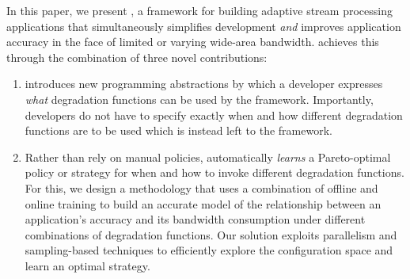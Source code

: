 In this paper, we present \sysname{}, a framework for building 
adaptive stream processing applications that simultaneously 
simplifies development \emph{and} improves application accuracy in 
the face of limited or varying wide-area bandwidth.
\sysname{} achieves this through the combination of three novel contributions: 
\begin{enumerate} 
\item \sysname{} introduces new programming abstractions by which a developer 
expresses \emph{what} degradation functions can be used by the framework. 
Importantly, developers do not have to specify exactly when and how different 
degradation functions are to be used which is instead left to the \sysname{} framework.
\item Rather than rely on manual policies, \sysname{} automatically \emph{learns} 
 a Pareto-optimal policy or strategy for when and how to invoke different degradation functions.
For this, we design a methodology that uses a combination of 
offline and online training to build an accurate model of the relationship between 
an application's accuracy and its bandwidth consumption under different combinations 
of degradation functions. Our solution exploits parallelism and sampling-based 
techniques to efficiently explore the configuration space and learn an optimal strategy.




\end{enumerate}
